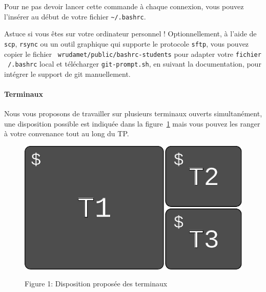 \documentclass[final, a4paper, openbib, ]{article}
\newcommand{\WR}[1]{\textcolor{purple}{#1}}
\newcommand{\WR}[1]{{#1}}
\begin{document}
Pour ne pas devoir lancer cette commande à chaque connexion, vous pouvez l'insérer au début de votre fichier \texttt{\~{}/.bashrc}.

\begin{alertinfo3}{Astuce si vous êtes sur votre ordinateur personnel !}
Optionnellement, à l'aide de \texttt{scp}, \texttt{rsync} ou un outil graphique qui supporte le protocole \texttt{sftp}, vous pouvez copier le fichier \texttt{~wrudamet/public/bashrc-students} pour adapter votre \texttt{fichier ~/.bashrc} local et télécharger \texttt{git-prompt.sh}, en suivant la documentation, pour intégrer le support de git manuellement.
\end{alertinfo3}

%

\paragraph{Terminaux}
Nous vous proposons de travailler sur plusieurs terminaux ouverts simultanément, une disposition possible est indiquée dans la figure~\ref{terminals} mais vous pouvez les ranger à votre convenance tout au long du TP.
\begin{figure}[h]
	\centering
	{\includegraphics[scale=0.45]{images/terminals.pdf}}
	\caption{Figure 1: Disposition proposée des terminaux}
	\label{terminals}
\end{figure}
\end{document}
